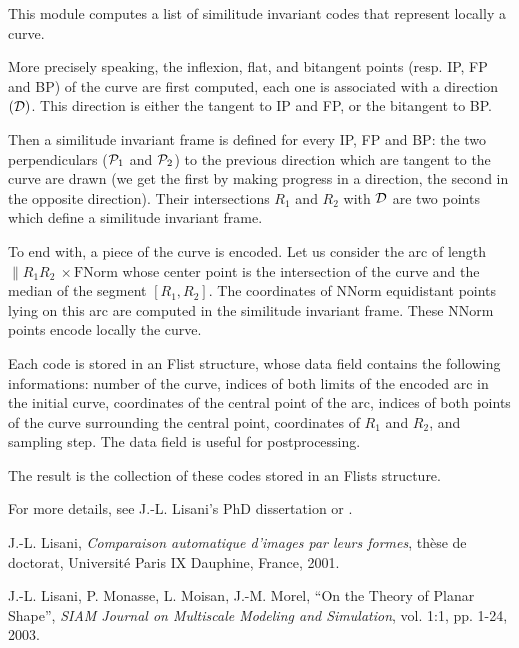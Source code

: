 This module computes a list of similitude invariant codes that represent locally a curve.

More precisely speaking, the inflexion, flat, and bitangent points (resp. IP, FP and BP) of the curve are first computed, each one is associated with a direction $(\cal D)$. This direction is either the tangent to IP and FP, or the bitangent to BP.

Then a similitude invariant frame is defined for every IP, FP and BP: the two perpendiculars (${\cal P}_1$ and ${\cal P}_2$) to the previous direction which are tangent to the curve are drawn (we get the first by making progress in a direction, the second in the opposite direction). Their intersections $R_1$ and $R_2$ with ${\cal D}$ are two points which define a similitude invariant frame.

To end with, a piece of the curve is encoded. Let us consider the arc of length $\| R_1R_2 \ \times \mbox{FNorm}$ whose center point is the intersection of the curve and the median of the segment $[R_1,R_2]$. The coordinates of $\mbox{NNorm}$ equidistant points lying on this arc are computed in the similitude invariant frame. These $\mbox{NNorm}$ points encode locally the curve.

\medskip

Each code is stored in an Flist structure, whose data field contains the following informations: number of the curve, indices of both limits of the encoded arc in the initial curve, coordinates of the central point of the arc, indices of both points of the curve surrounding the central point, coordinates of $R_1$ and $R_2$, and sampling step. The data field is useful for postprocessing.

The result is the collection of these codes stored in an Flists structure.

\medskip

For more details, see J.-L. Lisani's PhD dissertation \cite{joseluis} 
or \cite{LMMM}.

\medskip

\begin{thebibliography}{9}

 J.-L. {\sc Lisani}, {\it Comparaison automatique
d'images par leurs formes}, th\`ese de doctorat, Universit\'e Paris IX
Dauphine, France, 2001.

 J.-L. Lisani, P. Monasse, L. Moisan, J.-M. Morel, 
``On the Theory of Planar Shape'', 
{\it SIAM Journal on Multiscale Modeling and Simulation}, 
vol. 1:1, pp. 1-24, 2003. 

\end{thebibliography}
